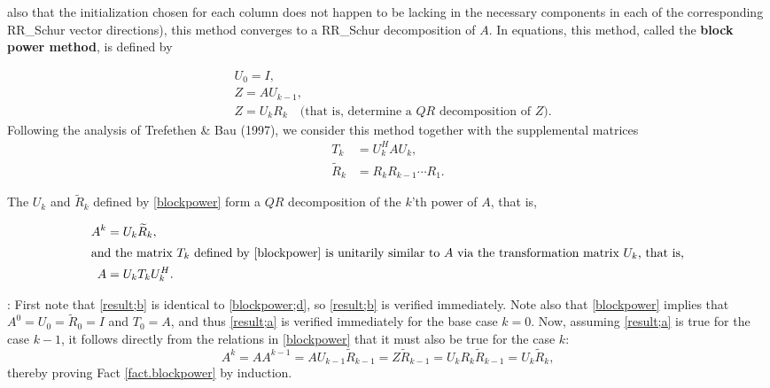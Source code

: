 also that the initialization chosen
for each column does not happen to be lacking in the necessary components in each of the corresponding RR_Schur vector
directions),
this method converges to a RR_Schur decomposition of $A$.  In equations, this method,
called the {\bf block power method}, is defined by
\begin{subeqnA}
\label{blockpower}
\begin{align}
& {U}_{0}=I, \label{blockpower;a}\\
& Z=A{U}_{k-1}, \label{blockpower;b}\\
& Z={U}_{k} {R}_{k} \quad \textrm{(that is, determine a $QR$ decomposition of $Z$)}.\label{blockpower;c}
\end{align}
Following the analysis of Trefethen \& Bau (1997), we consider this method together with the supplemental matrices
\begin{align}
T_{k}&={U}_{k}^H A {U}_{k},\label{blockpower;d}\\
{\widetilde R}_{k}&=R_{k} R_{k-1} \cdots R_{1}.  \label{blockpower;e}
\end{align}
\end{subeqnA}

\begin{fact} \label{fact.blockpower}
The ${U}_{k}$ and ${\widetilde R}_{k}$ defined by \eqref{blockpower}
form a $QR$ decomposition of the $k$'th power of $A$, that is,
\begin{subeqnA}
\label{result}
\begin{align}
A^k &= {U}_{k} {\widetilde R}_{k}, \label{result;a} \\
\intertext{and the matrix $T_{k}$ defined by \eqref{blockpower} is
unitarily similar to $A$ via the transformation matrix ${U}_{k}$, that is,}
A &= {U}_{k} T_{k} {U}_{k}^H. \label{result;b}
\end{align}
\end{subeqnA}
\end{fact}
\enlargethispage{3pt}

\/: 
First note that \eqref{result;b} is identical to \eqref{blockpower;d}, so \eqref{result;b} is verified immediately.  Note also
that \eqref{blockpower} implies that $A^0={U}_{0}={\widetilde R}_{0}=I$ and $T_{0}=A$, and thus \eqref{result;a}
is verified immediately for the base case $k=0$.  Now, assuming \eqref{result;a} is true for the case $k-1$,
it follows directly from the relations in \eqref{blockpower} that it must also be true for the case $k$:
\begin{equation*}
   A^k = A A^{k-1} = A {U}_{k-1} {\widetilde R}_{k-1} = Z {\widetilde R}_{k-1}
   = {U}_{k} {R}_{k} {\widetilde R}_{k-1} = {U}_{k} {\widetilde R}_{k},
\end{equation*}
thereby proving Fact \ref{fact.blockpower} by induction. \endproof

